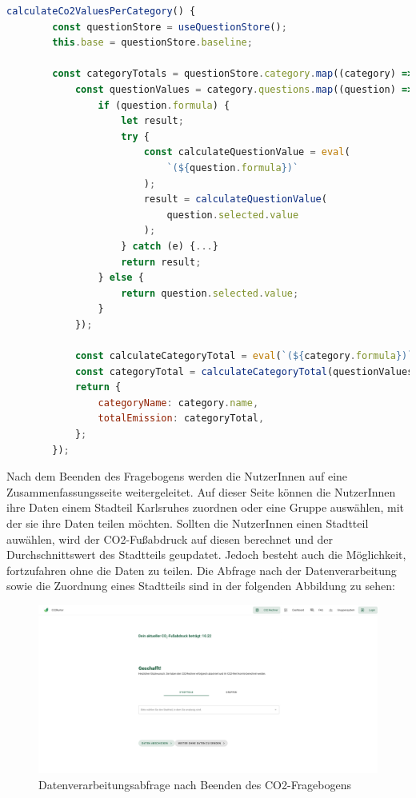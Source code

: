 \begin{lstlisting}[language={JavaScript}, caption={Ausschnitt aus dem totalCo2Emission.ts - Store}]
calculateCo2ValuesPerCategory() {
        const questionStore = useQuestionStore();
        this.base = questionStore.baseline;

        const categoryTotals = questionStore.category.map((category) => {
            const questionValues = category.questions.map((question) => {
                if (question.formula) {
                    let result;
                    try {
                        const calculateQuestionValue = eval(
                            `(${question.formula})`
                        );
                        result = calculateQuestionValue(
                            question.selected.value
                        );
                    } catch (e) {...}
                    return result;
                } else {
                    return question.selected.value;
                }
            });
            
            const calculateCategoryTotal = eval(`(${category.formula})`);
            const categoryTotal = calculateCategoryTotal(questionValues);
            return {
                categoryName: category.name,
                totalEmission: categoryTotal,
            };
        });
\end{lstlisting}

Nach dem Beenden des Fragebogens werden die NutzerInnen auf eine Zusammenfassungsseite weitergeleitet. Auf dieser Seite können die NutzerInnen ihre Daten einem Stadteil Karlsruhes zuordnen oder eine Gruppe auswählen, mit der sie ihre Daten teilen möchten. Sollten die NutzerInnen einen Stadtteil auwählen, wird der CO2-Fußabdruck auf diesen berechnet und der Durchschnittswert des Stadtteils geupdatet. Jedoch besteht auch die Möglichkeit, fortzufahren ohne die Daten zu teilen. Die Abfrage nach der Datenverarbeitung sowie die Zuordnung eines Stadtteils sind in der folgenden Abbildung zu sehen:

\begin{figure}[H]
    \centering
    \includegraphics[width=1\textwidth]{images/06/daten-verarbeitungs-seite.png}
    \caption{Datenverarbeitungsabfrage nach Beenden des CO2-Fragebogens}
    \label{fig:datenverarbeitungs-seite}
\end{figure}

